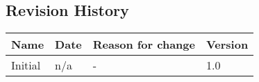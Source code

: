 \subsection{Revision History}
\begin{tabular}[t]{|l|l|l|l|}\hline
Name&Date&Reason for change&Version\\\hline\hline
Initial&n/a&-&1.0\\\hline
\end{tabular}
